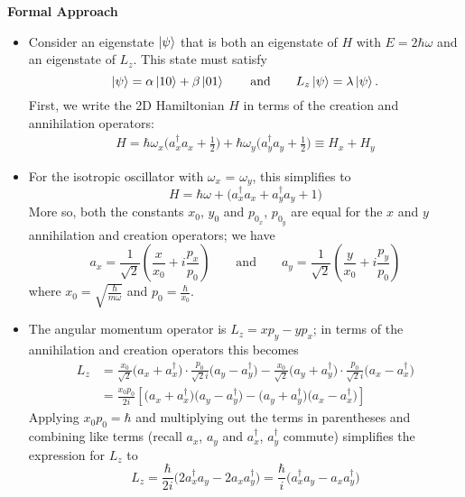 \documentclass[11pt, a4paper]{article}
\newcommand{\eqtext}[1]{\qquad \text{#1} \qquad}
\begin{document}
\textbf{Formal Approach}
\begin{itemize}
	\item Consider an eigenstate $ \ket{\psi} $ that is both an eigenstate of $ H $ with $ E = 2\hbar \omega $ and an eigenstate of $ L_{z} $. This state must satisfy
	\begin{equation*}
		\ket{\psi} = \alpha \ket{10} + \beta \ket{01} \eqtext{and} L_{z}\ket{\psi} = \lambda \ket{\psi}.
	\end{equation*}
	First, we write the 2D Hamiltonian $ H $ in terms of the creation and annihilation operators:
	\begin{align*}
		H = \hbar \omega_{x}\big(a_{x}^{\dagger}a_{x} + \tfrac{1}{2}\big) + \hbar \omega_{y}\big(a_{y}^{\dagger}a_{y} + \tfrac{1}{2}\big) \equiv H_{x} + H_{y}
	\end{align*}

	\item For the isotropic oscillator with $ \omega_{x} $ = $ \omega_{y} $, this simplifies to
	\begin{equation*}
		H = \hbar \omega + \big(a_{x}^{\dagger}a_{x} + a_{y}^{\dagger}a_{y} + 1\big)
	\end{equation*}
	More so, both the constants $ x_{0} $, $ y_{0} $ and $ p_{0_{x}} $, $ p_{0_{y}} $ are equal for the $ x $ and $ y $ annihilation and creation operators; we have
	\begin{equation*}
		a_{x} = \frac{1}{\sqrt{2}}\left(\frac{x}{x_{0}} + i\frac{p_{x}}{p_{0}}\right) \eqtext{and} a_{y} = \frac{1}{\sqrt{2}}\left(\frac{y}{x_{0}} + i\frac{p_{y}}{p_{0}}\right)
	\end{equation*}
	where $ x_{0} = \sqrt{\frac{\hbar}{m \omega}} $ and $ p_{0} = \frac{\hbar}{x_{0}} $. 
	
	\item The angular momentum operator is $ L_{z} = x p_{y} - y p_{x} $; in terms of the annihilation and creation operators this becomes
	\begin{align*}
		L_{z} &= \frac{x_{0}}{\sqrt{2}}\big(a_{x} + a_{x}^{\dagger}\big)\cdot \frac{p_{0}}{\sqrt{2}i}\big(a_{y} - a_{y}^{\dagger}\big) - \frac{x_{0}}{\sqrt{2}}\big(a_{y} + a_{y}^{\dagger}\big)\cdot \frac{p_{0}}{\sqrt{2}i}\big(a_{x} - a_{x}^{\dagger}\big)\\
		&=\frac{x_{0}p_{0}}{2i}\left[\big(a_{x}+a_{x}^{\dagger}\big)\big(a_{y}-a_{y}^{\dagger}\big) - \big(a_{y}+a_{y}^{\dagger}\big)\big(a_{x}-a_{x}^{\dagger}\big)\right]
	\end{align*}
	Applying $ x_{0}p_{0} = \hbar $ and multiplying out the terms in parentheses and combining like terms (recall $ a_{x} $, $ a_{y} $ and $ a_{x}^{\dagger} $, $ a_{y}^{\dagger} $ commute) simplifies the expression for $ L_{z} $  to
	\begin{equation*}
		L_{z} = \frac{\hbar}{2i}\big(2a_{x}^{\dagger}a_{y} - 2a_{x}a_{y}^{\dagger}\big) = \frac{\hbar}{i}\big(a_{x}^{\dagger}a_{y} - a_{x}a_{y}^{\dagger}\big)
	\end{equation*}
	

\end{itemize}
\end{document}
